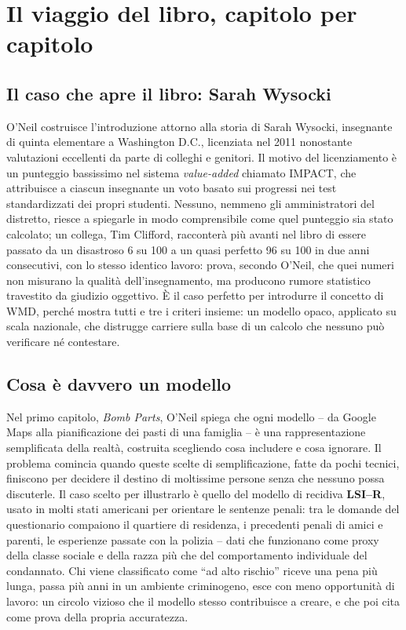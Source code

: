 \documentclass[a4paper,11pt]{article}
\begin{document}
\section{Il viaggio del libro, capitolo per capitolo}

\subsection{Il caso che apre il libro: Sarah Wysocki}

O'Neil costruisce l'introduzione attorno alla storia di Sarah Wysocki, insegnante di quinta elementare a Washington D.C., licenziata nel 2011 nonostante valutazioni eccellenti da parte di colleghi e genitori. Il motivo del licenziamento è un punteggio bassissimo nel sistema \emph{value-added} chiamato IMPACT, che attribuisce a ciascun insegnante un voto basato sui progressi nei test standardizzati dei propri studenti. Nessuno, nemmeno gli amministratori del distretto, riesce a spiegarle in modo comprensibile come quel punteggio sia stato calcolato; un collega, Tim Clifford, racconterà più avanti nel libro di essere passato da un disastroso 6 su 100 a un quasi perfetto 96 su 100 in due anni consecutivi, con lo stesso identico lavoro: prova, secondo O'Neil, che quei numeri non misurano la qualità dell'insegnamento, ma producono rumore statistico travestito da giudizio oggettivo. È il caso perfetto per introdurre il concetto di WMD, perché mostra tutti e tre i criteri insieme: un modello opaco, applicato su scala nazionale, che distrugge carriere sulla base di un calcolo che nessuno può verificare né contestare.

\subsection{Cosa è davvero un modello}

Nel primo capitolo, \emph{Bomb Parts}, O'Neil spiega che ogni modello -- da Google Maps alla pianificazione dei pasti di una famiglia -- è una rappresentazione semplificata della realtà, costruita scegliendo cosa includere e cosa ignorare. Il problema comincia quando queste scelte di semplificazione, fatte da pochi tecnici, finiscono per decidere il destino di moltissime persone senza che nessuno possa discuterle. Il caso scelto per illustrarlo è quello del modello di recidiva \textbf{LSI--R}, usato in molti stati americani per orientare le sentenze penali: tra le domande del questionario compaiono il quartiere di residenza, i precedenti penali di amici e parenti, le esperienze passate con la polizia -- dati che funzionano come proxy della classe sociale e della razza più che del comportamento individuale del condannato. Chi viene classificato come ``ad alto rischio'' riceve una pena più lunga, passa più anni in un ambiente criminogeno, esce con meno opportunità di lavoro: un circolo vizioso che il modello stesso contribuisce a creare, e che poi cita come prova della propria accuratezza.
\end{document}
